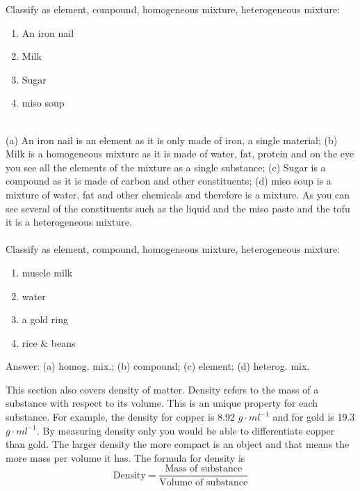 \documentclass[main.tex]{subfiles}
\begin{document}
\begin{description}
\begin{example} %
Classify as  element, compound, homogeneous mixture, heterogeneous mixture:
\begin{multicols}{4}
\begin{enumerate}[label=(\alph*)]
\item An iron nail
\item Milk
\item Sugar
\item miso soup 
\end{enumerate}
\end{multicols}
\\
(a) An iron nail is an element as it is only made of iron, a single material; (b) Milk is a homogeneous mixture as it is made of water, fat, protein and on the eye you see all the elements of the mixture as a single substance; (c) Sugar is a compound as it is made of carbon and other constituents; (d) miso soup is a mixture of water, fat and other chemicals and therefore is a mixture. As you can see several of the constituents such as the liquid and the miso paste and the tofu it is a heterogeneous mixture.\\
\faDiamond\ \\
Classify as  element, compound, homogeneous mixture, heterogeneous mixture:
\begin{multicols}{4}
\begin{enumerate}[label=(\alph*)]
\item muscle milk
\item water
\item a gold ring
\item rice \& beans
\end{enumerate}
\end{multicols}
\flushright Answer: (a) homog. mix.; (b) compound; (c) element; (d) heterog. mix.
\end{example}%



\item[\docfilehook{Density }{Density }] This section also covers density of matter. Density refers to the mass of a substance with respect to its volume. This is an unique property for each substance. For example, the density for copper is 8.92 $g\cdot ml^{-1}$ and for gold is 19.3 $g\cdot ml^{-1}$. By measuring density only you would be able to differentiate copper than gold. The larger density the more compact is an object and that means the more mass per volume it has. The formula for density is
\begin{equation}
\boxed{   \text{Density}=\frac{\text{Mass of substance}}{\text{Volume of substance}}   }
\label{formula1:1}
\end{equation}


\end{description}
\end{document}
